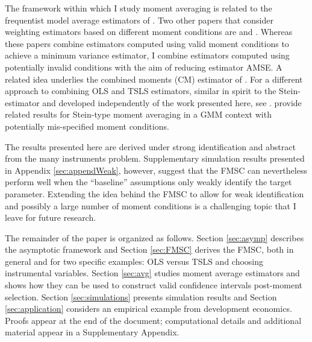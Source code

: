 The framework within which I study moment averaging is related to the frequentist model average estimators of \cite{HjortClaeskens}.
Two other papers that consider weighting estimators based on different moment conditions are \cite{Xiao} and \cite{ChenChavezLinton}.
Whereas these papers combine estimators computed using valid moment conditions to achieve a minimum variance estimator, I combine estimators computed using potentially invalid conditions with the aim of reducing estimator AMSE.
A related idea underlies the combined moments (CM) estimator of \cite{Judge2007}.
For a different approach to combining OLS and TSLS estimators, similar in spirit to the Stein-estimator and developed independently of the work presented here, see \cite{HansenStein}. 
\cite{ChengLiaoShi} provide related results for Stein-type moment averaging in a GMM context with potentially mis-specified moment conditions.

The results presented here are derived under strong identification and abstract from the many instruments problem. 
Supplementary simulation results presented in Appendix \ref{sec:appendWeak}, however, suggest that the FMSC can nevertheless perform well when the ``baseline'' assumptions only weakly identify the target parameter. 
Extending the idea behind the FMSC to allow for weak identification and possibly a large number of moment conditions is a challenging topic that I leave for future research.

The remainder of the paper is organized as follows.
Section \ref{sec:asymp} describes the asymptotic framework and Section \ref{sec:FMSC} derives the FMSC, both in general and for two specific examples: OLS versus TSLS and choosing instrumental variables.
Section \ref{sec:avg} studies moment average estimators and shows how they can be used to construct valid confidence intervals post-moment selection.
Section \ref{sec:simulations} presents simulation results and Section \ref{sec:application} considers an empirical example from development economics.
Proofs appear at the end of the document; computational details and additional material appear in a Supplementary Appendix. 
